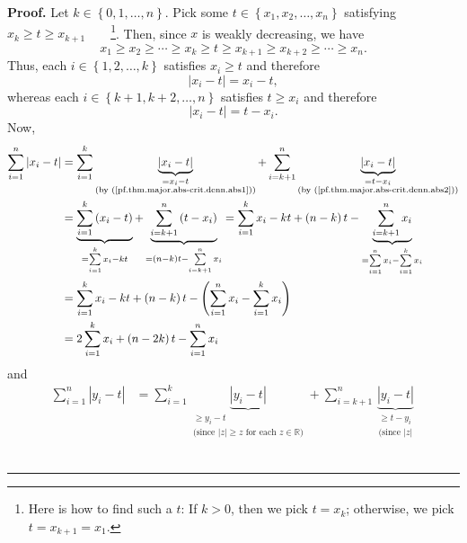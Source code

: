\documentclass[numbers=enddot,12pt,final,onecolumn,notitlepage]{scrartcl}%
\numberwithin{exer}{subsection}
\theoremstyle{definition}
\newenvironment{proof}[1][Proof]{\noindent\textbf{#1.} }{\ \rule{0.5em}{0.5em}}
\let\sumnonlimits\sum
\renewcommand{\sum}{\sumnonlimits\limits}
\begin{document}
\begin{proof}
Let $k\in\left\{  0,1,\ldots,n\right\}  $. Pick some $t\in\left\{  x_{1}%
,x_{2},\ldots,x_{n}\right\}  $ satisfying $x_{k}\geq t\geq x_{k+1}%
$\ \ \ \ \footnote{Here is how to find such a $t$: If $k>0$, then we pick
$t=x_{k}$; otherwise, we pick $t=x_{k+1}=x_{1}$.}. Then, since $x$ is weakly
decreasing, we have%
\[
x_{1}\geq x_{2}\geq\cdots\geq x_{k}\geq t\geq x_{k+1}\geq x_{k+2}\geq
\cdots\geq x_{n}.
\]
Thus, each $i\in\left\{  1,2,\ldots,k\right\}  $ satisfies $x_{i}\geq t$ and
therefore%
\begin{equation}
\left\vert x_{i}-t\right\vert =x_{i}-t,
\label{pf.thm.major.abs-crit.denn.abs1}%
\end{equation}
whereas each $i\in\left\{  k+1,k+2,\ldots,n\right\}  $ satisfies $t\geq x_{i}$
and therefore%
\begin{equation}
\left\vert x_{i}-t\right\vert =t-x_{i}.
\label{pf.thm.major.abs-crit.denn.abs2}%
\end{equation}
Now,%
\begin{align}
\sum_{i=1}^{n}\left\vert x_{i}-t\right\vert  &  =\sum_{i=1}^{k}%
\underbrace{\left\vert x_{i}-t\right\vert }_{\substack{=x_{i}-t\\\text{(by
(\ref{pf.thm.major.abs-crit.denn.abs1}))}}}+\sum_{i=k+1}^{n}%
\underbrace{\left\vert x_{i}-t\right\vert }_{\substack{=t-x_{i}\\\text{(by
(\ref{pf.thm.major.abs-crit.denn.abs2}))}}}\nonumber\\
&  =\underbrace{\sum_{i=1}^{k}\left(  x_{i}-t\right)  }_{=\sum_{i=1}^{k}%
x_{i}-kt}+\underbrace{\sum_{i=k+1}^{n}\left(  t-x_{i}\right)  }_{=\left(
n-k\right)  t-\sum_{i=k+1}^{n}x_{i}}=\sum_{i=1}^{k}x_{i}-kt+\left(
n-k\right)  t-\underbrace{\sum_{i=k+1}^{n}x_{i}}_{=\sum_{i=1}^{n}x_{i}%
-\sum_{i=1}^{k}x_{i}}\nonumber\\
&  =\sum_{i=1}^{k}x_{i}-kt+\left(  n-k\right)  t-\left(  \sum_{i=1}^{n}%
x_{i}-\sum_{i=1}^{k}x_{i}\right) \nonumber\\
&  =2\sum_{i=1}^{k}x_{i}+\left(  n-2k\right)  t-\sum_{i=1}^{n}x_{i}
\label{pf.thm.major.abs-crit.denn.abs-x}%
\end{align}
and%
\begin{align}
\sum_{i=1}^{n}\left\vert y_{i}-t\right\vert  &  =\sum_{i=1}^{k}%
\underbrace{\left\vert y_{i}-t\right\vert }_{\substack{\geq y_{i}%
-t\\\text{(since }\left\vert z\right\vert \geq z\text{ for each }%
z\in\mathbb{R}\text{)}}}+\sum_{i=k+1}^{n}\underbrace{\left\vert y_{i}%
-t\right\vert }_{\substack{\geq t-y_{i}\\\text{(since }\left\vert z\right\vert
}}
\end{align}
\end{proof}
\end{document}
